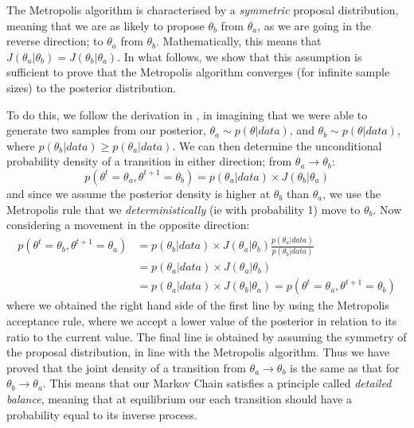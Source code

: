 \documentclass[11pt,fullpage]{book}
\begin{document}
The Metropolis algorithm is characterised by a \textit{symmetric} proposal distribution, meaning that we are as likely to propose $\theta_b$ from $\theta_a$, as we are going in the reverse direction; to $\theta_a$ from $\theta_b$. Mathematically, this means that $J(\theta_a|\theta_b)=J(\theta_b|\theta_a)$. In what follows, we show that this assumption is sufficient to prove that the Metropolis algorithm converges (for infinite sample sizes) to the posterior distribution.

To do this, we follow the derivation in \cite{gelman2013bayesian}, in imagining that we were able to generate two samples from our posterior, $\theta_a\sim p(\theta|data)$, and $\theta_b\sim p(\theta|data)$, where $p(\theta_b|data)\geq p(\theta_a|data)$. We can then determine the unconditional probability density of a transition in either direction; from $\theta_a\rightarrow\theta_b$:
%
\begin{equation}
p(\theta^{t}=\theta_a,\theta^{t+1}=\theta_b) = p(\theta_a|data)\times J(\theta_b|\theta_a)
\end{equation}
%
and since we assume the posterior density is higher at $\theta_b$ than $\theta_a$, we use the Metropolis rule that we \textit{deterministically} (ie with probability 1) move to $\theta_b$. Now considering a movement in the opposite direction:
%
\begin{equation}
\begin{align}
p(\theta^{t} = \theta_b,\theta^{t+1}=\theta_a) &= p(\theta_b|data) \times J(\theta_a|\theta_b) \frac{p(\theta_a|data)}{p(\theta_b|data)}\\
&= p(\theta_a|data)\times J(\theta_a|\theta_b)\\
&= p(\theta_a|data)\times J(\theta_b|\theta_a)=p(\theta^{t}=\theta_a,\theta^{t+1}=\theta_b)
\end{align}
\end{equation}
%
where we obtained the right hand side of the first line by using the Metropolis acceptance rule, where we accept a lower value of the posterior in relation to its ratio to the current value. The final line is obtained by assuming the symmetry of the proposal distribution, in line with the Metropolis algorithm. Thus we have proved that the joint density of a transition from $\theta_a\rightarrow\theta_b$ is the same as that for $\theta_b\rightarrow\theta_a$. This means that our Markov Chain satisfies a principle called \textit{detailed balance}, meaning that at equilibrium our each transition should have a probability equal to its inverse process. 
\end{document}
